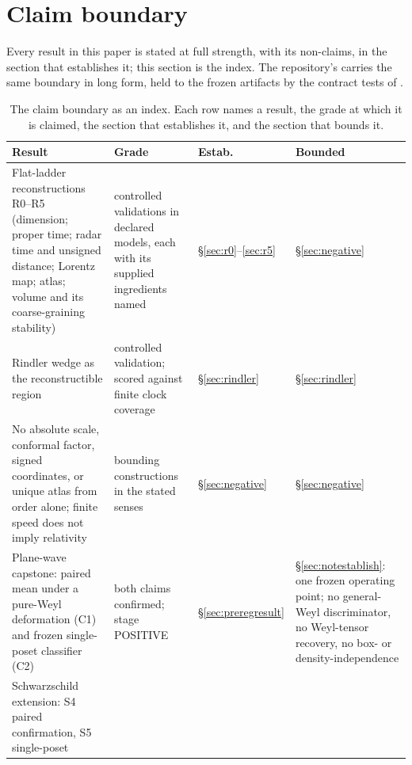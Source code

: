 \section{Claim boundary}\label{sec:claims}

Every result in this paper is stated at full strength, with its non-claims,
in the section that establishes it; this section is the index. The
repository's  carries the same boundary in long
form, held to the frozen artifacts by the contract tests of
.

\begin{table}[t]
\caption{The claim boundary as an index. Each row names a result, the grade
at which it is claimed, the section that establishes it, and the section
that bounds it.}
\label{tab:claims}
\centering
\footnotesize
\begin{tabular}{@{}>{\raggedright\arraybackslash}p{10.5pc}>{\raggedright\arraybackslash}p{8pc}>{\raggedright\arraybackslash}p{3.6pc}>{\raggedright\arraybackslash}p{10pc}@{}}
\toprule
Result & Grade & Estab. & Bounded \\
\midrule
Flat-ladder reconstructions R0--R5 (dimension; proper time; radar time and
unsigned distance; Lorentz map; atlas; volume and its coarse-graining
stability) & controlled validations in declared models, each with its
supplied ingredients named & \S\ref{sec:r0}--\ref{sec:r5} &
\S\ref{sec:negative} \\
Rindler wedge as the reconstructible region & controlled validation; scored
against finite clock coverage & \S\ref{sec:rindler} & \S\ref{sec:rindler} \\
No absolute scale, conformal factor, signed coordinates, or unique atlas
from order alone; finite speed does not imply relativity & bounding
constructions in the stated senses & \S\ref{sec:negative} &
\S\ref{sec:negative} \\
Plane-wave capstone: paired mean under a pure-Weyl deformation (C1) and
frozen single-poset classifier (C2) & both claims confirmed; stage POSITIVE
& \S\ref{sec:preregresult} & \S\ref{sec:notestablish}: one frozen operating
point; no general-Weyl discriminator, no Weyl-tensor recovery, no box- or
density-independence \\
Schwarzschild extension: S4 paired confirmation, S5 single-poset

\end{tabular}
\end{table}

